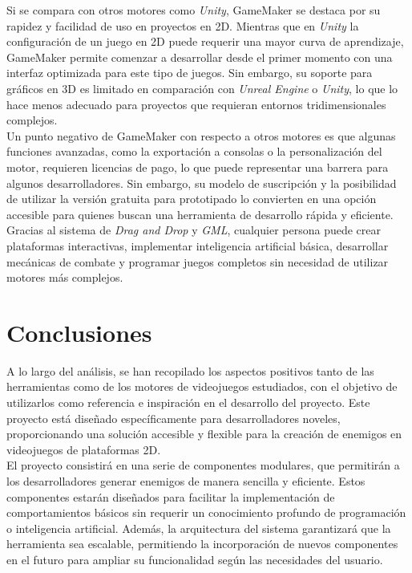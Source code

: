 Si se compara con otros motores como \textit{Unity}, GameMaker se destaca por su rapidez y facilidad de uso en proyectos en 2D. Mientras que en \textit{Unity} la configuración de un juego en 2D puede requerir una mayor curva de aprendizaje, GameMaker permite comenzar a desarrollar desde el primer momento con una interfaz optimizada para este tipo de juegos. Sin embargo, su soporte para gráficos en 3D es limitado en comparación con \textit{Unreal Engine} o \textit{Unity}, lo que lo hace menos adecuado para proyectos que requieran entornos tridimensionales complejos.\\

Un punto negativo de GameMaker con respecto a otros motores es que algunas funciones avanzadas, como la exportación a consolas o la personalización del motor, requieren licencias de pago, lo que puede representar una barrera para algunos desarrolladores. Sin embargo, su modelo de suscripción y la posibilidad de utilizar la versión gratuita para prototipado lo convierten en una opción accesible para quienes buscan una herramienta de desarrollo rápida y eficiente.\\

Gracias al sistema de \textit{Drag and Drop} y \textit{GML}, cualquier persona puede crear plataformas interactivas, implementar inteligencia artificial básica, desarrollar mecánicas de combate y programar juegos completos sin necesidad de utilizar motores más complejos.\\
\section{Conclusiones}

A lo largo del análisis, se han recopilado los aspectos positivos tanto de las herramientas como de los motores de videojuegos estudiados, con el objetivo de utilizarlos como referencia e inspiración en el desarrollo del proyecto. Este proyecto está diseñado específicamente para desarrolladores noveles, proporcionando una solución accesible y flexible para la creación de enemigos en videojuegos de plataformas 2D.\\

El proyecto consistirá en una serie de componentes modulares, que permitirán a los desarrolladores generar enemigos de manera sencilla y eficiente. Estos componentes estarán diseñados para facilitar la implementación de comportamientos básicos sin requerir un conocimiento profundo de programación o inteligencia artificial. Además, la arquitectura del sistema garantizará que la herramienta sea escalable, permitiendo la incorporación de nuevos componentes en el futuro para ampliar su funcionalidad según las necesidades del usuario.\\

